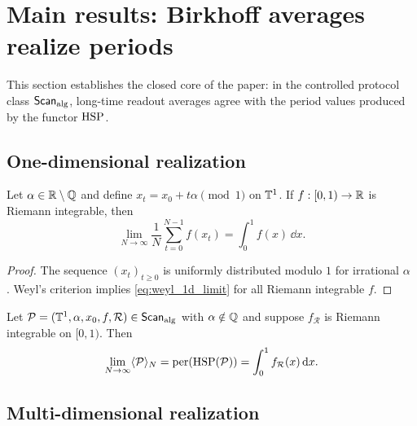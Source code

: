 
\section{Main results: Birkhoff averages realize periods}
\label{sec:period_realization}

This section establishes the closed core of the paper: in the controlled protocol class $\mathsf{Scan}_{\mathrm{alg}}$, long-time readout averages agree with the period values produced by the functor $\mathrm{HSP}$.

\subsection{One-dimensional realization}
\label{sec:period_realization_1d}

\begin{theorem}[Weyl equidistribution $\Rightarrow$ period realization in $d=1$]
\label{thm:weyl_1d}
Let $\alpha\in\mathbb{R}\setminus\mathbb{Q}$ and define $x_t=x_0+t\alpha\pmod{1}$ on $\mathbb{T}^1$. If $f:[0,1)\to\mathbb{R}$ is Riemann integrable, then
\begin{equation}
\label{eq:weyl_1d_limit}
\lim_{N\to\infty}\frac{1}{N}\sum_{t=0}^{N-1} f(x_t)
=\int_0^1 f(x)\,\dd x.
\end{equation}
\end{theorem}

\begin{proof}
The sequence $(x_t)_{t\ge 0}$ is uniformly distributed modulo $1$ for irrational $\alpha$ \cite{Weyl1916,KuipersNiederreiter1974}. Weyl's criterion implies \eqref{eq:weyl_1d_limit} for all Riemann integrable $f$.
\end{proof}

\begin{corollary}[Protocol limit equals the period value in $d=1$]
\label{cor:scan_period_1d}
Let $\mathcal{P}=(\mathbb{T}^1,\alpha,x_0,f,\mathcal{R})\in\mathsf{Scan}_{\mathrm{alg}}$ with $\alpha\notin\mathbb{Q}$ and suppose $f_{\mathcal{R}}$ is Riemann integrable on $[0,1)$. Then
\begin{equation}
\label{eq:scan_period_1d}
\lim_{N\to\infty}\langle \mathcal{P} \rangle_N
=\mathrm{per}(\mathrm{HSP}(\mathcal{P}))
=\int_0^1 f_{\mathcal{R}}(x)\,\mathrm{d} x.
\end{equation}
\end{corollary}

\subsection{Multi-dimensional realization}
\label{sec:period_realization_md}

